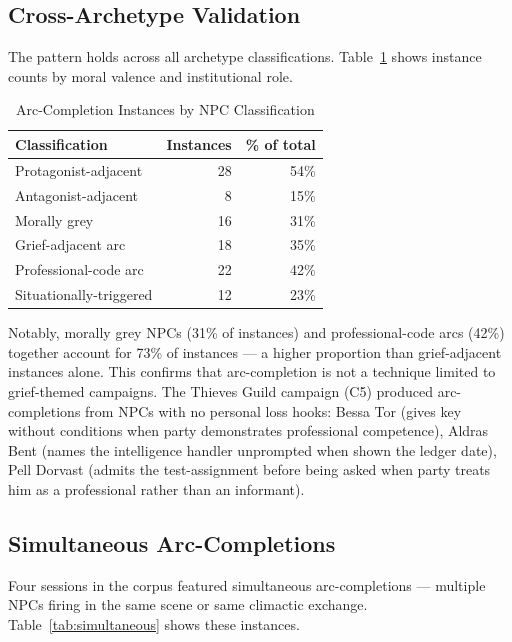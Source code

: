 \subsection{Cross-Archetype Validation}

The pattern holds across all archetype classifications. Table~\ref{tab:moral-valence}
shows instance counts by moral valence and institutional role.

\begin{table}[t]
\caption{Arc-Completion Instances by NPC Classification}
\label{tab:moral-valence}
\begin{tabular}{@{}lrr@{}}
\toprule
Classification & Instances & \% of total \\
\midrule
Protagonist-adjacent & 28 & 54\% \\
Antagonist-adjacent & 8 & 15\% \\
Morally grey & 16 & 31\% \\
\midrule
Grief-adjacent arc & 18 & 35\% \\
Professional-code arc & 22 & 42\% \\
Situationally-triggered & 12 & 23\% \\
\bottomrule
\end{tabular}
\end{table}

Notably, morally grey NPCs (31\% of instances) and professional-code arcs (42\%)
together account for 73\% of instances --- a higher proportion than grief-adjacent
instances alone. This confirms that arc-completion is not a technique limited to
grief-themed campaigns. The Thieves Guild campaign (C5) produced arc-completions
from NPCs with no personal loss hooks: Bessa Tor (gives key without conditions
when party demonstrates professional competence), Aldras Bent (names the intelligence
handler unprompted when shown the ledger date), Pell Dorvast (admits the test-assignment
before being asked when party treats him as a professional rather than an informant).

\subsection{Simultaneous Arc-Completions}

Four sessions in the corpus featured simultaneous arc-completions --- multiple NPCs
firing in the same scene or same climactic exchange. Table~\ref{tab:simultaneous}
shows these instances.

